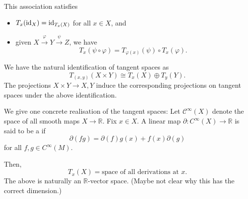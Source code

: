 \documentclass[12pt]{article}
\begin{document}
This association satisfies 
\begin{itemize}
	\item $T_{x}(\operatorname{id}_{X}) = \operatorname{id}_{T_{x}(X)}$ for all $x \in X$, and
	\item given $X \xrightarrow{\varphi} Y \xrightarrow{\psi} Z$, we have
	\begin{equation*} 
		T_{x}(\psi \circ \varphi) = T_{\varphi(x)}(\psi) \circ T_{x}(\varphi).
	\end{equation*}
\end{itemize}
We have the natural identification of tangent spaces as
\begin{equation*} 
	T_{(x, y)}(X \times Y) \cong T_{x}(X) \oplus T_{y}(Y).
\end{equation*}
The projections $X \times Y \to X, Y$ induce the corresponding projections on tangent spaces under the above identification.

We give one concrete realisation of the tangent spaces: 
Let $\mathcal{C}^{\infty}(X)$ denote the space of all smooth maps $X \to \mathbb{R}$. 
Fix $x \in X$.
A linear map $\partial \colon C^{\infty}(X) \to \mathbb{R}$ is said to be a  if 
\begin{equation*} 
	\partial(fg) = \partial(f) g(x) + f(x) \partial(g)
\end{equation*}
for all $f, g \in C^{\infty}(M)$.

Then,
\begin{equation*} 
	T_{x}(X) = \text{space of all derivations at $x$}.
\end{equation*}
The above is naturally an $\mathbb{R}$-vector space. (Maybe not clear why this has the correct dimension.)
\end{document}
